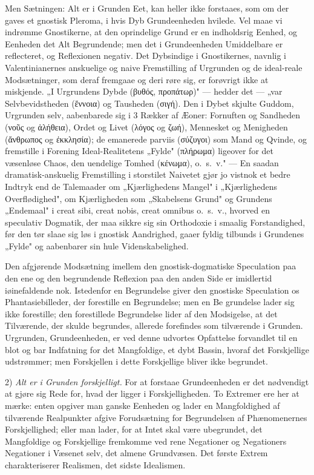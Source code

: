 \documentclass[12pt]{book}
\newcommand{\opage}[1]{\marginnote{\footnotesize\textit{[#1]}}}
\begin{document}
Men Sætningen: Alt er i Grunden Eet, kan heller ikke forstaaes, som om der gaves et
gnostisk Pleroma, i hvis Dyb Grundeenheden hvilede. Vel maae vi indrømme Gnostikerne,
at den oprindelige Grund er en indholdsrig Eenhed, og Eenheden det Alt Begrundende;
men det i Grundeenheden Umiddelbare er reflecteret, og Reflexionen negativ. Det
Dybsindige i Gnostikernes, navnlig i Valentinianernes anskuelige og naive Fremstilling
af Urgrunden og de ideal-reale Modsætninger, som deraf fremgaae og deri røre sig, er
forøvrigt ikke at miskjende. „I Urgrundens Dybde (βυθός, προπάτωρ)" --- hedder det ---
„var Selvbevidstheden (ἔννοια) og Tausheden (σιγή). Den i Dybet skjulte Guddom,
Urgrunden selv, aabenbarede sig i 3 Rækker af Æoner: Fornuften og Sandheden (νοῦς og
ἀλήθεια), Ordet og Livet (λόγος og ζωή), Mennesket og Menigheden (ἄνθρωπος og
ἐκκλησία); de emanerede parviis (σύζυγοι) som Mand og Qvinde, og fremstille i Forening
Ideal-Realitetens „Fylde" (πλήρωμα) ligeover for det væsenløse Chaos, den uendelige
Tomhed (κένωμα), o.\ s.\ v." --- En saadan dramatisk-anskuelig Fremstilling i
storstilet Naivetet gjør jo vistnok et bedre Indtryk end de Talemaader om
„Kjærlighedens Mangel" i „Kjærlighedens Overflødighed", om Kjærligheden som
„Skabelsens Grund" og Grundens „Endemaal" i creat sibi, creat nobis, creat omnibus
o.\ s.\ v., hvorved en speculativ Dogmatik, der maa sikkre sig sin Orthodoxie i
smaalig Forstandighed, før den tør slaae sig løs i gnostisk Aandrighed, gaaer fyldig
tilbunds i Grundenes „Fylde" og aabenbarer sin hule Videnskabelighed.

Den afgjørende Modsætning imellem den gnostisk-dogmatiske Speculation paa den ene og
den begrundende Reflexion paa den anden Side er imidlertid iøinefaldende nok.
Istedenfor en Begrundelse giver den gnostiske Speculation os Phantasiebilleder, der
forestille en Begrundelse; men en Be%
\opage{96} grundelse lader sig ikke forestille; den forestillede Begrundelse lider af den
Modsigelse, at det Tilværende, der skulde begrundes, allerede forefindes som
tilværende i Grunden. Urgrunden, Grundeenheden, er ved denne udvortes Opfattelse
forvandlet til en blot og bar Indfatning for det Mangfoldige, et dybt Bassin, hvoraf
det Forskjellige udstrømmer; men Forskjellen i dette Forskjellige bliver ikke
begrundet.

2) \emph{Alt er i Grunden forskjelligt.} For at forstaae Grundeenheden er det
nødvendigt at gjøre sig Rede for, hvad der ligger i Forskjelligheden. To Extremer ere
her at mærke: enten opgiver man ganske Eenheden og lader en Mangfoldighed af tilværende
Realpunkter afgive Forudsætning for Begrundelsen af Phænomenernes Forskjellighed;
eller man lader, for at Intet skal være ubegrundet, det Mangfoldige og Forskjellige
fremkomme ved rene Negationer og Negationers Negationer i Væsenet selv, det almene
Grundvæsen. Det første Extrem charakteriserer Realismen, det sidste Idealismen.
\end{document}
